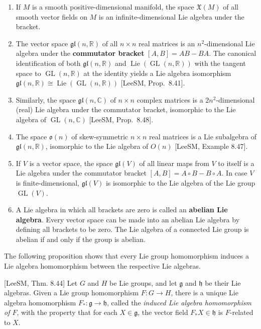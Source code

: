 \begin{example}\label{ex:lie-algebras}
\begin{enumerate}
\item[(a)] If $M$ is a smooth positive-dimensional manifold, the space $\mathfrak{X}(M)$ of all smooth vector fields on $M$ is an infinite-dimensional Lie algebra under the bracket.
\item[(b)] The vector space $\mathfrak{gl}(n, \mathbb{R})$ of all $n \times n$ real matrices is an $n^2$-dimensional Lie algebra under the \textbf{commutator bracket} $[A, B] = AB - BA$. The canonical identification of both $\mathfrak{gl}(n, \mathbb{R})$ and $\operatorname{Lie}(\operatorname{GL}(n, \mathbb{R}))$ with the tangent space to $\operatorname{GL}(n, \mathbb{R})$ at the identity yields a Lie algebra isomorphism $\mathfrak{gl}(n, \mathbb{R}) \cong \operatorname{Lie}(\operatorname{GL}(n, \mathbb{R}))$ [LeeSM, Prop.\ 8.41].
\item[(c)] Similarly, the space $\mathfrak{gl}(n, \mathbb{C})$ of $n \times n$ complex matrices is a $2n^2$-dimensional (real) Lie algebra under the commutator bracket, isomorphic to the Lie algebra of $\operatorname{GL}(n, \mathbb{C})$ [LeeSM, Prop.\ 8.48].
\item[(d)] The space $\mathfrak{o}(n)$ of skew-symmetric $n \times n$ real matrices is a Lie subalgebra of $\mathfrak{gl}(n, \mathbb{R})$, isomorphic to the Lie algebra of $O(n)$ [LeeSM, Example 8.47].
\item[(e)] If $V$ is a vector space, the space $\mathfrak{gl}(V)$ of all linear maps from $V$ to itself is a Lie algebra under the commutator bracket $[A, B] = A \circ B - B \circ A$. In case $V$ is finite-dimensional, $\mathfrak{gl}(V)$ is isomorphic to the Lie algebra of the Lie group $\operatorname{GL}(V)$.
\item[(f)] A Lie algebra in which all brackets are zero is called an \textbf{abelian Lie algebra}. Every vector space can be made into an abelian Lie algebra by defining all brackets to be zero. The Lie algebra of a connected Lie group is abelian if and only if the group is abelian.
\end{enumerate}
\end{example}

The following proposition shows that every Lie group homomorphism induces a Lie algebra homomorphism between the respective Lie algebras.

\begin{proposition}\label{prop:induced-lie-algebra-homomorphism}
[LeeSM, Thm. 8.44] Let $G$ and $H$ be Lie groups, and let $\mathfrak{g}$ and $\mathfrak{h}$ be their Lie algebras. Given a Lie group homomorphism $F: G \to H$, there is a unique Lie algebra homomorphism $F_*: \mathfrak{g} \to \mathfrak{h}$, called the \textit{induced Lie algebra homomorphism of $F$}, with the property that for each $X \in \mathfrak{g}$, the vector field $F_* X \in \mathfrak{h}$ is $F$-related to $X$.
\end{proposition}

